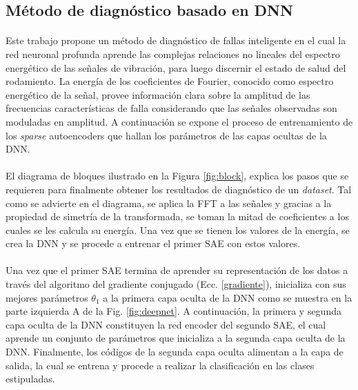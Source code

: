 \documentclass[12pt]{article}
\begin{document}
\subsection{Método de diagnóstico basado en DNN}
\label{sec:training}
\paragraph{}
Este trabajo propone un método de diagnóstico de fallas inteligente en el cual la red neuronal profunda aprende las complejas relaciones no lineales del espectro energético de las señales de vibración, para luego discernir el estado de salud del rodamiento. La energía de los coeficientes de Fourier, conocido como espectro energético de la señal, provee información clara sobre la amplitud de las frecuencias características de falla considerando que las señales observadas son moduladas en amplitud. A continuación se expone el proceso de entrenamiento de los \textit{sparse} autoencoders que hallan los parámetros de las capas ocultas de la DNN.

\paragraph{}
El diagrama de bloques ilustrado en la Figura \ref{fig:block}, explica los pasos que se requieren para finalmente obtener los resultados de diagnóstico de un \textit{dataset}. Tal como se advierte en el diagrama, se aplica la FFT a las señales y gracias a la propiedad de simetría de la transformada, se toman la mitad de coeficientes a los cuales se les calcula su energía. Una vez que se tienen los valores de la energía, se crea la DNN y se procede a entrenar el primer SAE con estos valores.

\paragraph{}
Una vez que el primer SAE termina de aprender su representación de los datos a través del algoritmo del gradiente conjugado (Ecc. \ref{gradiente}), inicializa con sus mejores parámetros $\theta_{1}$ a la primera capa oculta de la DNN como se muestra en la parte izquierda A de la Fig. \ref{fig:deepnet}. A continuación, la primera y segunda capa oculta de la DNN constituyen la red encoder del segundo SAE, el cual aprende un conjunto de parámetros que inicializa a la segunda capa oculta de la DNN. Finalmente, los códigos de la segunda capa oculta alimentan a la capa de salida, la cual se entrena y procede a realizar la clasificación en las clases estipuladas.
\end{document}
